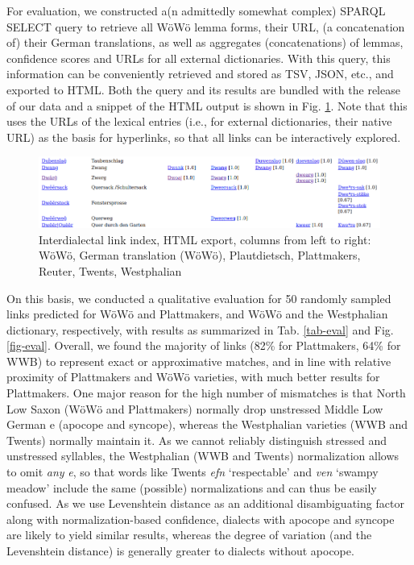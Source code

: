 \documentclass[11pt]{article}
\newcommand{\word}[1]{\textsl{#1}} %
\newcommand{\todo}[1]{}                                 %
\begin{document}
For evaluation, we constructed a(n admittedly somewhat complex) SPARQL SELECT query to retrieve all WöWö lemma forms, their URL, (a concatenation of) their German translations, as well as aggregates (concatenations) of lemmas, confidence scores and URLs for all external dictionaries. With this query, this information can be conveniently retrieved and stored as TSV, JSON, etc., and exported to HTML. Both the query and its results are bundled with the release of our data and a snippet of the HTML output is shown in Fig. \ref{fig-interdialectal-links-in-html}. Note that this uses the URLs of the lexical entries (i.e., for external dictionaries, their native URL) as the basis for hyperlinks, so that all links can be interactively explored.


\begin{figure}
    \centering
    \includegraphics[width=1\linewidth]{img/html.png}
    \caption{Interdialectal link index, HTML export, columns from left to right: WöWö, German translation (WöWö), Plautdietsch, Plattmakers, Reuter, Twents, Westphalian}
    \label{fig-interdialectal-links-in-html}
\end{figure}

\todo{update fig-interdialectal-links-in-html with Sass}

On this basis, we conducted a qualitative evaluation for 50 randomly sampled links predicted for WöWö and Plattmakers, and WöWö and the Westphalian dictionary, respectively, with results as summarized in Tab. \ref{tab-eval} and Fig. \ref{fig-eval}. 
Overall, we found the majority of links (82\% for Plattmakers, 64\% for WWB) to represent exact or approximative matches, and in line with relative proximity of Plattmakers and WöWö varieties, with much better results for Plattmakers. One major reason for the high number of mismatches is that North Low Saxon (WöWö and Plattmakers) normally drop unstressed Middle Low German e (apocope and syncope), whereas the Westphalian varieties (WWB and Twents) normally maintain it. 
As we cannot reliably distinguish stressed and unstressed syllables, the Westphalian (WWB and Twents) normalization allows to omit \emph{any} \word{e}, so that words like Twents \word{efn} `respectable' and \word{ven} `swampy meadow' include the same (possible) normalizations and can thus be easily confused. As we use Levenshtein distance as an additional disambiguating factor along with normalization-based confidence, dialects with apocope and syncope are likely to yield similar results, whereas the degree of variation (and the Levenshtein distance) is generally greater to dialects without apocope.
\end{document}
